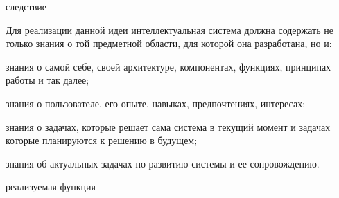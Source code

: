 \begin{SCn}
\begin{scnindent}
\begin{scnindent}
\begin{scnindent}
\begin{scnrelfromlistcustom}{следствие}
				\end{scnrelfromlistcustom}
				{Для реализации данной идеи интеллектуальная система должна содержать не только знания о той предметной области, для которой она разработана, но и:
				\begin{scnitemize}
					\item знания о самой себе, своей архитектуре, компонентах, функциях, принципах работы и так далее;
					\item знания о пользователе, его опыте, навыках, предпочтениях, интересах;
					\item знания о задачах, которые решает сама система в текущий момент и задачах которые планируются к решению в будущем;
					\item знания об актуальных задачах по развитию системы и ее сопровождению. 
				\end{scnitemize}
			}
			\begin{scnindent}
			\end{scnindent}
			\begin{scnrelfromlistcustom}{реализуемая функция}
			\end{scnrelfromlistcustom}
		\end{scnindent}
	\end{scnindent}
	\end{scnindent}
\end{SCn}

\vspace{-\baselineskip}

